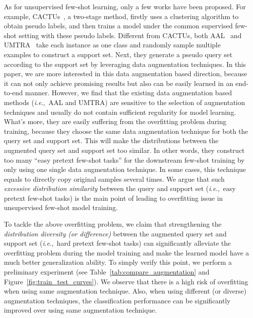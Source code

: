 \documentclass[letterpaper]{article} \usepackage{aaai21}  \usepackage{times}  \usepackage{helvet} \usepackage{courier}  \usepackage[hyphens]{url}  \usepackage{graphicx} \urlstyle{rm} \def\UrlFont{\rm}  \usepackage{natbib}  \usepackage{caption} \usepackage{url}
\newcommand{\ie}{\textit{i}.\textit{e}.,}
\begin{document}
As for unsupervised few-shot learning, only a few works have been proposed. For example, CACTUs~\cite{Hsu2019ICLR}, a two-stage method, firstly uses a clustering algorithm to obtain pseudo labels, and then trains a model under the common supervised few-shot setting with these pseudo labels. Different from CACTUs, both AAL~\cite{AAL2019ICML} and UMTRA~\cite{UMTRA2019NIPS} take each instance as one class and randomly sample multiple examples to construct a support set. Next, they generate a pseudo query set according to the support set by leveraging data augmentation techniques. In this paper, we are more interested in this data augmentation based direction, because it can not only achieve promising results but also can be easily learned in an end-to-end manner. However, we find that the existing data augmentation based methods (\ie~AAL and UMTRA) are sensitive to the selection of augmentation techniques and usually do not contain sufficient regularity for model learning. What's more, they are easily suffering from the overfitting problem during training, because they choose the same data augmentation technique for both the query set and support set. This will make the distributions between the augmented query set and support set too similar. In other words, they construct too many ``easy pretext few-shot tasks'' for the downstream few-shot training by only using one single data augmentation technique. 
In some cases, this technique equals to directly copy original samples several times.
We argue that such \textit{excessive distribution similarity} between the query and support set (\ie~easy pretext few-shot tasks) is the main point of leading to overfitting issue in unsupervised few-shot model training.



To tackle the above overfitting problem, we claim that strengthening the \textit{distribution diversity (or difference)} between the augmented query set and support set (\ie~hard pretext few-shot tasks) can significantly alleviate the overfitting problem during the model training and make the learned model have a much better generalization ability. To simply verify this point, we perform a preliminary experiment (see 
Table~\ref{tab:compare_augmentation} and Figure~\ref{fig:train_test_curves}). 
We observe that there is a high risk of overfitting when using same augmentation technique.
Also, when using different (or diverse) augmentation techniques, the classification performance can be significantly improved over using same augmentation technique.
\end{document}
